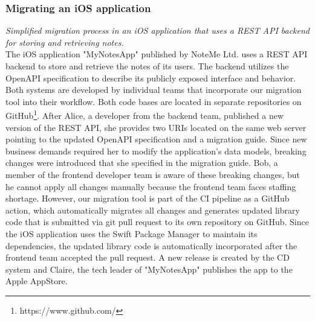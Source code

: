 \subsubsection{Migrating an iOS application}
\label{subsubsec:Scenario:RESTScenario}

\textit{Simplified migration process in an iOS application that uses a REST API backend for storing and retrieving notes.}
\medskip
\\The iOS application "MyNotesApp" published by NoteMe Ltd. uses a REST API backend to store and retrieve the notes of its users. The backend utilizes the OpenAPI specification to describe its publicly exposed interface and behavior. Both systems are developed by individual teams that incorporate our migration tool into their workflow. Both code bases are located in separate repositories on GitHub\footnote{https://www.github.com/}. After Alice, a developer from the backend team, published a new version of the REST API, she provides two URIs located on the same web server pointing to the updated OpenAPI specification and a migration guide. Since new business demands required her to modify the application's data models, breaking changes were introduced that she specified in the migration guide. Bob, a member of the frontend developer team is aware of these breaking changes, but he cannot apply all changes manually because the frontend team faces staffing shortage. However, our migration tool is part of the CI pipeline as a GitHub action, which automatically migrates all changes and generates updated library code that is submitted via git pull request to its own repository on GitHub. Since the iOS application uses the Swift Package Manager to maintain its dependencies, the updated library code is automatically incorporated after the frontend team accepted the pull request. A new release is created by the CD system and Claire, the tech leader of "MyNotesApp" publishes the app to the Apple AppStore.
